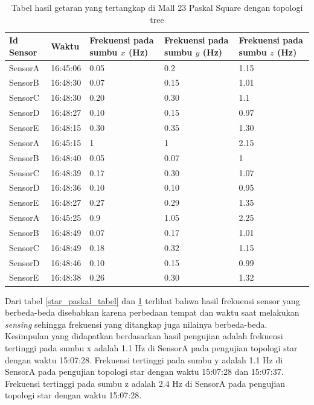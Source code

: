 \begin{itemize}
    \begin{table}[H]
	\centering
	\caption{Tabel hasil getaran yang tertangkap di Mall 23 Paskal Square dengan topologi tree}
	\label{tree_paskal_tabel}
    	\begin{tabular}{|p{2cm}|p{2cm}|p{3cm}|p{3cm}|p{3cm}|}
    		\hline 
    		Id Sensor & Waktu & Frekuensi pada sumbu $x$ (Hz) & Frekuensi pada sumbu $y$ (Hz) & Frekuensi pada sumbu $z$ (Hz) \\
    		\hline
    		SensorA & 16:45:06 & 0.05 & 0.2 & 1.15 \\
    		\hline
    		SensorB & 16:48:30 & 0.07 & 0.15 & 1.01 \\
    		\hline
    		SensorC & 16:48:30 & 0.20 & 0.30 & 1.1 \\
    		\hline
    		SensorD & 16:48:27 & 0.10 & 0.15 & 0.97 \\
    		\hline
    		SensorE & 16:48:15 & 0.30 & 0.35 & 1.30 \\
    		\hline
    		SensorA & 16:45:15 & 1 & 1 & 2.15 \\
    		\hline
    		SensorB & 16:48:40 & 0.05 & 0.07 & 1 \\
    		\hline
    		SensorC & 16:48:39 & 0.17 & 0.30 & 1.07 \\
    		\hline
    		SensorD & 16:48:36 & 0.10 & 0.10 & 0.95 \\
    		\hline
    		SensorE & 16:48:27 & 0.27 & 0.29 & 1.35 \\
    		\hline
    		SensorA & 16:45:25 & 0.9 & 1.05 & 2.25 \\
    		\hline
    		SensorB & 16:48:49 & 0.07 & 0.17 & 1.01 \\
    		\hline
    		SensorC & 16:48:49 & 0.18 & 0.32 & 1.15 \\
    		\hline
    		SensorD & 16:48:46 & 0.10 & 0.15 & 0.99 \\
    		\hline
    		SensorE & 16:48:38 & 0.26 & 0.30 & 1.32 \\
    		\hline
    	\end{tabular}
    \end{table}
\end{itemize}

Dari tabel \ref{star_paskal_tabel} dan \ref{tree_paskal_tabel} terlihat bahwa hasil frekuensi sensor yang berbeda-beda disebabkan karena perbedaan tempat dan waktu saat melakukan \textit{sensing} sehingga frekuensi yang ditangkap juga nilainya berbeda-beda. Kesimpulan yang didapatkan berdasarkan hasil pengujian adalah frekuensi tertinggi pada sumbu x adalah 1.1 Hz di SensorA pada pengujian topologi star dengan waktu 15:07:28. Frekuensi tertinggi pada sumbu y adalah 1.1 Hz di SensorA pada pengujian topologi star dengan waktu 15:07:28 dan 15:07:37. Frekuensi tertinggi pada sumbu z adalah 2.4 Hz di SensorA pada pengujian topologi star dengan waktu 15:07:28.

